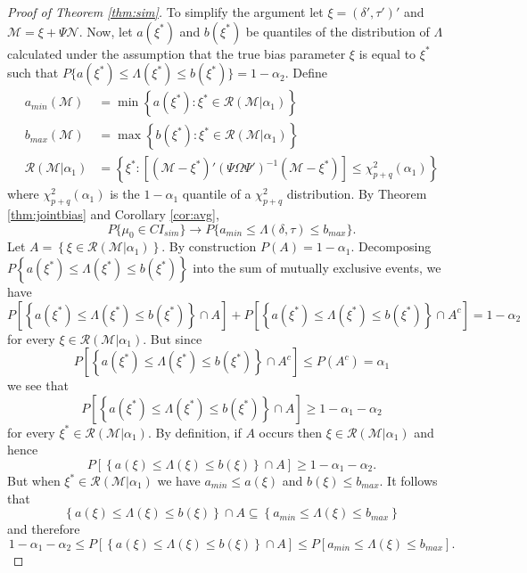 \begin{proof}[Proof of Theorem \ref{thm:sim}]
To simplify the argument let $\xi = (\delta', \tau')'$ and $\mathscr{M} = \xi + \Psi \mathscr{N}$.
Now, let $a(\xi^*)$ and  $b(\xi^*)$ be quantiles of the distribution of $\Lambda$ calculated under the assumption that the true bias parameter $\xi$ is equal to $\xi^*$ such that $P\{a(\xi^*) \leq \Lambda(\xi^*)\leq b(\xi^*)\} = 1-\alpha_2$.
Define
\begin{align*}
  a_{min}(\mathscr{M}) &= \min\left\{a(\xi^*) \colon \xi^* \in \mathscr{R}(\mathscr{M}|\alpha_1)  \right\}\\
  b_{max}(\mathscr{M}) &= \max\left\{b(\xi^*) \colon \xi^* \in \mathscr{R}(\mathscr{M}|\alpha_1)  \right\}\\
  \mathscr{R}(\mathscr{M}|\alpha_1) &= \left\{ \xi^* \colon \left[\left(\mathscr{M} - \xi^*\right)' \left( \Psi \Omega \Psi' \right)^{-1}\left( \mathscr{M} - \xi^* \right)\right] \leq \chi^2_{p+q}(\alpha_1) \right\}
\end{align*}
where $\chi_{p+q}^2(\alpha_1)$ is the $1-\alpha_1$ quantile of a $\chi_{p+q}^2$ distribution. 
By Theorem \ref{thm:jointbias} and Corollary \ref{cor:avg}, 
\[
P\{ \mu_0 \in CI_{sim}\} \rightarrow P\{ a_{min} \leq \Lambda(\delta, \tau) \leq b_{max}\}.
\]
Let $A = \left \{\xi \in \mathscr{R}(\mathscr{M}|\alpha_1) \right\}$.
By construction $P(A) = 1 - \alpha_1$.
Decomposing $P\left\{ a(\xi^*) \leq \Lambda(\xi^*) \leq b(\xi^*)  \right\}$ into the sum of mutually exclusive events, we have
\[
P\left[\left\{ a(\xi^*) \leq \Lambda(\xi^*) \leq b(\xi^*)  \right\} \cap A \right] + P\left[\left\{ a(\xi^*) \leq \Lambda(\xi^*) \leq b(\xi^*)  \right\} \cap A^c \right] = 1-\alpha_2
\]
for every $\xi \in \mathscr{R}(\mathcal{M}|\alpha_1)$.
But since 
\[
P\left[\left\{ a(\xi^*) \leq \Lambda(\xi^*) \leq b(\xi^*)  \right\} \cap A^c \right] \leq P(A^c) = \alpha_1
\]
we see that
\[
P\left[\left\{ a(\xi^*) \leq \Lambda(\xi^*) \leq b(\xi^*)  \right\} \cap A \right] \geq 1- \alpha_1 - \alpha_2
\]
for every $\xi^* \in \mathscr{R}(\mathscr{M}|\alpha_1)$.
By definition, if $A$ occurs then $\xi \in \mathscr{R}(\mathscr{M}|\alpha_1)$ and hence 
\[
P\left[\left\{ a(\xi) \leq \Lambda(\xi) \leq b(\xi)  \right\} \cap A \right] \geq 1- \alpha_1 - \alpha_2.
\]
But when $\xi^* \in  \mathscr{R}(\mathscr{M}|\alpha_1)$ we have
$a_{min} \leq a(\xi)$ and $b(\xi) \leq b_{max}$. It follows that 
\[
\left \{ a(\xi) \leq \Lambda (\xi) \leq b(\xi) \right \} \cap A \subseteq \left\{ a_{min} \leq \Lambda (\xi) \leq b_{max}\right \}
\]
and therefore
\[
  1-\alpha_1 - \alpha_2 \leq P\left[\left \{ a(\xi) \leq \Lambda (\xi) \leq b(\xi) \right \} \cap A  \right]
\leq P\left[ a_{min} \leq \Lambda(\xi) \leq b_{max} \right].
\]
\end{proof}

